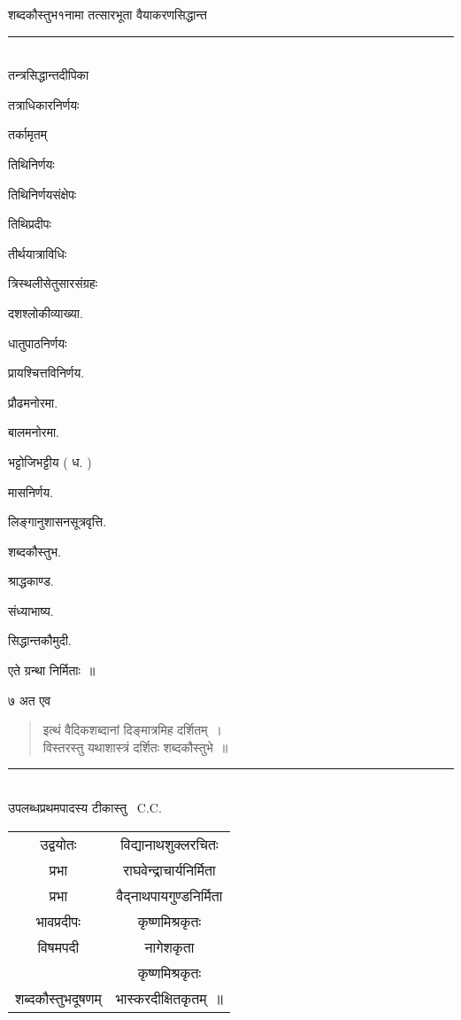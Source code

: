 \documentclass[11pt, openany]{book}
\begin{document}
\begin{multicols}{2}
\noindent
शब्दकौस्तुभ१नामा तत्सारभूता वैयाकरणसिद्धान्त \textendash\ 

\noindent
\rule{1\linewidth}{0.5pt}\\

तन्त्रसिद्धान्तदीपिका

तत्राधिकारनिर्णयः 

तर्कामृतम् 

तिथिनिर्णयः 

तिथिनिर्णयसंक्षेपः 

तिथिप्रदीपः 

तीर्थयात्राविधिः 

त्रिस्थलीसेतुसारसंग्रहः 

दशश्लोकीव्याख्या. 

धातुपाठनिर्णयः 

प्रायश्चित्तविनिर्णय. 

प्रौढमनोरमा. 

बालमनोरमा. 

भट्टोजिभट्टीय ( ध. ) 

मासनिर्णय. 

लिङ्गानुशासनसूत्रवृत्ति. 

शब्दकौस्तुभ. 

श्राद्धकाण्ड. 

संध्याभाष्य. 

सिद्धान्तकौमुदी. 

एते ग्रन्था निर्मिताः~॥ 

\noindent
७ अत एव \textendash\ 

\begin{quote}
{\qt इत्थं वैदिकशब्दानां दिङ्मात्रमिह दर्शितम्~।\\
विस्तरस्तु यथाशास्त्रं दर्शितः शब्दकौस्तुभे~॥}
\end{quote}

\noindent
\rule{1\linewidth}{0.5pt}\\

 उपलब्धप्रथमपादस्य टीकास्तु \textendash\ C.C.

\begin{tabular}{c c}
उद्वयोतः& विद्यानाथशुक्लरचितः \\
प्रभा& राघवेन्द्राचार्यनिर्मिता \\
प्रभा &वैद्नाथपायगुण्डनिर्मिता\\
भावप्रदीपः& कृष्णमिश्रकृतः\\
विषमपदी& नागेशकृता \\
& कृष्णमिश्रकृतः\\
शब्दकौस्तुभदूषणम्& भास्करदीक्षितकृतम्~॥
\end{tabular}


\end{multicols}
\end{document}
